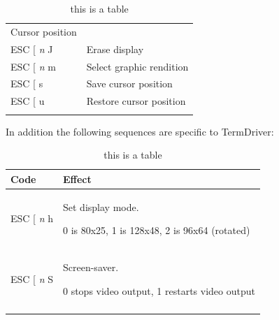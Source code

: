 \documentclass{article}
\begin{document}
\begin{longtable}[]{@{}ll@{}}
\begin{minipage}[t]{0.60\columnwidth}
Cursor position\strut
\end{minipage}\tabularnewline
\begin{minipage}[t]{0.34\columnwidth}\raggedright
ESC {[} \emph{n} J\strut
\end{minipage} & \begin{minipage}[t]{0.60\columnwidth}\raggedright
Erase display\strut
\end{minipage}\tabularnewline
\begin{minipage}[t]{0.34\columnwidth}\raggedright
ESC {[} \emph{n} m\strut
\end{minipage} & \begin{minipage}[t]{0.60\columnwidth}\raggedright
Select graphic rendition\strut
\end{minipage}\tabularnewline
\begin{minipage}[t]{0.34\columnwidth}\raggedright
ESC {[} s\strut
\end{minipage} & \begin{minipage}[t]{0.60\columnwidth}\raggedright
Save cursor position\strut
\end{minipage}\tabularnewline
\begin{minipage}[t]{0.34\columnwidth}\raggedright
ESC {[} u\strut
\end{minipage} & \begin{minipage}[t]{0.60\columnwidth}\raggedright
Restore cursor position\strut
\end{minipage}\tabularnewline
\bottomrule
\caption{this is a table}
\end{longtable}

In addition the following sequences are specific to TermDriver:

\begin{longtable}[]{@{}ll@{}}
\toprule
\begin{minipage}[b]{0.34\columnwidth}\raggedright
Code\strut
\end{minipage} & \begin{minipage}[b]{0.60\columnwidth}\raggedright
Effect\strut
\end{minipage}\tabularnewline
\midrule
\endhead
\begin{minipage}[t]{0.34\columnwidth}\raggedright
ESC {[} \emph{n} h\strut
\end{minipage} & \begin{minipage}[t]{0.60\columnwidth}\raggedright
Set display mode.

0 is 80x25, 1 is 128x48, 2 is 96x64 (rotated)\strut
\end{minipage}\tabularnewline
\begin{minipage}[t]{0.34\columnwidth}\raggedright
ESC {[} \emph{n} S\strut
\end{minipage} & \begin{minipage}[t]{0.60\columnwidth}\raggedright
Screen-saver.

0 stops video output, 1 restarts video output\strut
\end{minipage}\tabularnewline
\bottomrule
\caption{this is a table}
\end{longtable}
\end{document}
